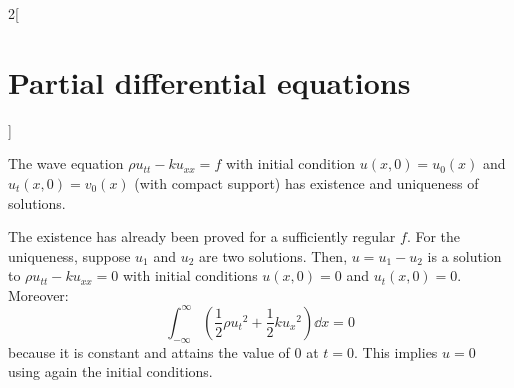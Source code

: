 \documentclass[../../../main_math.tex]{subfiles}
\begin{document}
\begin{multicols}{2}[\section{Partial differential equations}]
  \begin{corollary}
    The wave equation $\rho u_{tt}-ku_{xx}=f$ with initial condition $u(x,0)=u_0(x)$ and $u_t(x,0)=v_0(x)$ (with compact support) has existence and uniqueness of solutions.
  \end{corollary}
  \begin{sproof}
    The existence has already been proved for a sufficiently regular $f$. For the uniqueness, suppose $u_1$ and $u_2$ are two solutions. Then, $u=u_1-u_2$ is a solution to $\rho u_{tt}-ku_{xx}=0$ with initial conditions $u(x,0)=0$ and $u_t(x,0)=0$. Moreover: $$\int_{-\infty}^\infty\left(\frac{1}{2}\rho{u_t}^2+\frac{1}{2}k{u_x}^2\right)\dd{x}=0$$ because it is constant and attains the value of 0 at $t=0$. This implies $u=0$ using again the initial conditions.
  \end{sproof}

\end{multicols}
\end{document}
